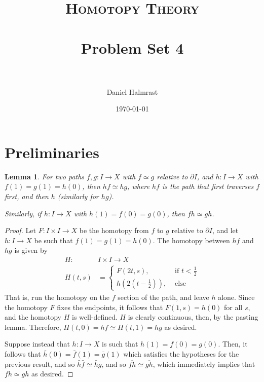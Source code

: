 \documentclass[fontsize=11pt]{scrartcl} %
\title{	
\normalfont \normalsize 
\textsc{Homotopy Theory} \\ [25pt] %
\horrule{0.5pt} \\[0.4cm] %
\huge Problem Set 4 \\ %
\horrule{2pt} \\[0.5cm] %
}
\author{Daniel Halmrast} %
\date{\normalsize\today} %
\numberwithin{equation}{section} %
\numberwithin{figure}{section} %
\numberwithin{table}{section} %
\newtheorem{lemma}{Lemma}
\begin{document}
\maketitle %

\section*{Preliminaries}

\begin{lemma}
    For two paths $f,g:I\to X$ with $f\simeq g$ relative to $\partial I$, and
    $h:I\to X$ with $f(1)=g(1)=h(0)$, then $hf\simeq hg$, where $hf$ is the
    path that first traverses $f$ first, and then $h$ (similarly for $hg$).

    Similarly, if $h:I\to X$ with $h(1) = f(0)=g(0)$, then $fh\simeq gh$.
\end{lemma}

\begin{proof}
    Let $F:I\times I\to X$ be the homotopy from $f$ to $g$ relative to $\partial
    I$, and let $h:I\to X$ be such that $f(1)=g(1)=h(0)$. The homotopy between
    $hf$ and $hg$ is given by
    \[
        \begin{aligned}
            H:&I\times I\to X\\
            H(t,s) &=
        \begin{cases}
            F(2t,s), &\text{ if }t<\frac{1}{2}\\
            h(2(t-\frac{1}{2})), &\text { else}
        \end{cases}
        \end{aligned}
    \]
    That is, run the homotopy on the $f$ section of the path, and leave $h$
    alone. Since the homotopy $F$ fixes the endpoints, it follows that
    $F(1,s)=h(0)$ for all $s$, and the homotopy $H$ is well-defined. $H$ is
    clearly continuous, then, by the pasting lemma. Therefore, $H(t,0) =
    hf\simeq H(t,1)=hg$ as desired.

    Suppose instead that $h:I\to X$ is such that $h(1)=f(0)=g(0)$. Then, it
    follows that $\overline{h}(0) = \overline{f}(1)=\overline{g}(1)$ which
    satisfies the hypotheses for the previous result, and so
    $\bar{h}\bar{f}\simeq \bar{h}\bar{g}$, and so
    $\overline{fh}\simeq \overline{gh}$, which immediately implies that
    $fh\simeq gh$ as desired.
\end{proof}

\newpage
\end{document}
